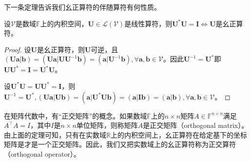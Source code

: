 \documentclass[main.tex]{subfiles}
\begin{document}
下一条定理告诉我们幺正算符的伴随算符有何性质。

\begin{theorem}\label{thm:II.6.4}
设$\mathcal{V}$是数域$\mathbb{F}$上的内积空间，$\mathbf{U}\in\mathcal{L}\left(\mathcal{V}\right)$是线性算符，则$\mathbf{U}^*\mathbf{U}=\mathbf{I}\Leftrightarrow\mathbf{U}$是幺正算符。
\end{theorem}
\begin{proof}
设$\mathbf{U}$是幺正算符，则$\mathbf{U}$可逆，且$\left(\mathbf{Ua}|\mathbf{b}\right)=\left(\mathbf{Ua}|\mathbf{UU}^{-1}\mathbf{b}\right)=\left(\mathbf{a}|\mathbf{U}^{-1}\mathbf{b}\right),\forall\mathbf{a},\mathbf{b}\in\mathcal{V}$。因此$\mathbf{U}^{-1}=\mathbf{U}^*$即$\mathbf{UU}^*=\mathbf{I}=\mathbf{U}^*\mathbf{U}$。

设$\mathbf{U}^*\mathbf{U}=\mathbf{UU}^*=\mathbf{I}$，则$\mathbf{U}^{-1}=\mathbf{U}^*,\left(\mathbf{Ua}|\mathbf{Ub}\right)=\left(\mathbf{a}|\mathbf{U}^*\mathbf{Ub}\right)=\left(\mathbf{a}|\mathbf{Ib}\right)=\left(\mathbf{a}|\mathbf{b}\right),\forall\mathbf{a},\mathbf{b}\in\mathcal{V}$。
\end{proof}

在矩阵代数中，有“正交矩阵”的概念。如果数域$\mathbb{F}$上的$n\times n$矩阵$A\in\mathbb{F}^{n\times n}$满足$A^\intercal A=I$，其中$I$是$n\times n$单位矩阵，则称矩阵$A$是正交矩阵（orthogonal matrix）。由上面的定理可知，只有在实数域$\mathbb{R}$上的内积空间上，幺正算符在给定基下的坐标矩阵是才是一个正交矩阵。因此，我们又把实数域上的幺正算符称为正交算符（orthogonal operator）。
\end{document}
